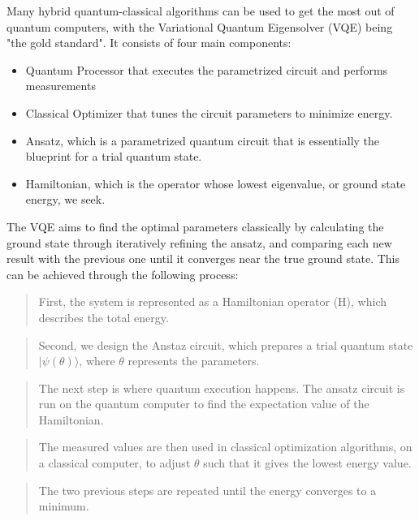\documentclass[a4paper]{report}
\begin{document}
{\begin{itemize}
\begin{figure}
\end{figure}
Many hybrid quantum-classical algorithms can be used to get the most out of quantum computers, with the Variational Quantum Eigensolver (VQE) being "the gold standard". It consists of four main components: 
\begin{itemize}
    \item Quantum Processor that executes the parametrized circuit and performs measurements
    \item Classical Optimizer that tunes the circuit parameters to minimize energy.
    \item Ansatz, which is a parametrized quantum circuit that is essentially the blueprint for a trial quantum state.
    \item Hamiltonian, which is the operator whose lowest eigenvalue, or ground state energy, we seek.
\end{itemize}
The VQE aims to find the optimal parameters classically by calculating the ground state through iteratively refining the ansatz, and comparing each new result with the previous one until it converges near the true ground state.
This can be achieved through the following process: 
\begin{quote}
    First, the system is represented as a Hamiltonian operator (H), which describes the total energy.
\end{quote}
\begin{quote}
     Second, we design the Anstaz circuit, which prepares a trial quantum state  \(|\psi (\theta )\rangle \), where $\theta$ represents the parameters.
\end{quote}
\begin{quote}
    The next step is where quantum execution happens. The ansatz circuit is run on the quantum computer to find the expectation value of the Hamiltonian.
\end{quote}
\begin{quote}
    The measured values are then used in classical optimization algorithms, on a classical computer, to adjust $\theta$ such that it gives the lowest energy value.
\end{quote}
\begin{quote}
    The two previous steps are repeated until the energy converges to a minimum.\cite{vqe}\cite{howvqe}
\end{quote} 
\begin{center}
    
\end{center}


\end{itemize}}
\end{document}
